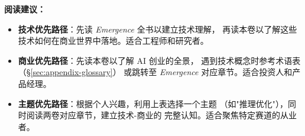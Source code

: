 \bigskip

\noindent\textbf{阅读建议：}

\begin{itemize}
  \item \textbf{技术优先路径}：先读 \textit{Emergence} 全书以建立技术理解，
    再读本卷以了解这些技术如何在商业世界中落地。适合工程师和研究者。

  \item \textbf{商业优先路径}：先读本卷以了解 AI 创业的全景，
    遇到技术概念时参考术语表（§\ref{sec:appendix-glossary}）
    或跳转至 \textit{Emergence} 对应章节。适合投资人和产品经理。

  \item \textbf{主题优先路径}：根据个人兴趣，利用上表选择一个主题
    （如"推理优化"），同时阅读两卷对应章节，建立技术-商业的
    完整认知。适合聚焦特定赛道的从业者。
\end{itemize}

